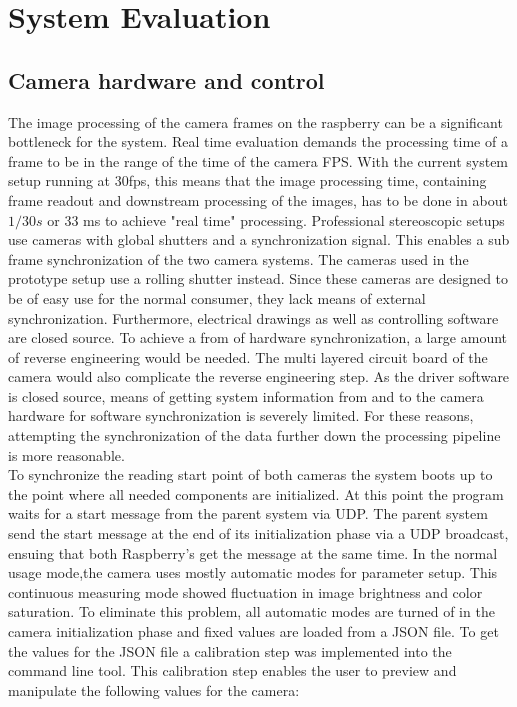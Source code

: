 \chapter{System Evaluation}
\section{Camera hardware and control}
The image  processing of the camera frames on the raspberry can be a significant bottleneck for the system. Real time evaluation demands the processing time of a frame to be in the range of the time of the camera FPS. With the current system setup running at 30fps, this means that the image processing time, containing frame readout and downstream processing of the images, has to be done in about $1/30s$ or 33 ms to achieve "real time" processing. Professional stereoscopic setups use cameras with global shutters and a synchronization signal. This enables a sub frame synchronization of the two camera systems. The cameras used in the prototype setup use a rolling shutter instead. Since these cameras are designed to be of easy use for the normal consumer, they lack means of external synchronization. Furthermore, electrical drawings as well as controlling software are closed source. To achieve a from of hardware synchronization, a large amount of reverse engineering would be needed. The multi layered circuit board of the camera would also complicate the reverse engineering step. As the driver software is closed source, means of getting system information from and to the camera hardware for software synchronization is severely limited. For these reasons, attempting the synchronization of the data further down the processing pipeline is more reasonable.
\\To synchronize the reading start point of both cameras the system boots up to the point where all needed components are initialized. At this point the program waits for a start message from the parent system via UDP. The parent system send the start message at the end of its initialization phase via a UDP broadcast, ensuing that both Raspberry's get the message at the same time.
\newpage
In the normal usage mode,the camera uses mostly automatic modes for parameter setup. This continuous measuring mode showed fluctuation in image brightness and color saturation. To eliminate this problem, all automatic modes are turned of in the camera initialization phase and fixed values are loaded from a JSON file. To get the values for the JSON file a calibration step was implemented into the command line tool. This calibration step enables the user to preview and manipulate the  following values for the camera:
